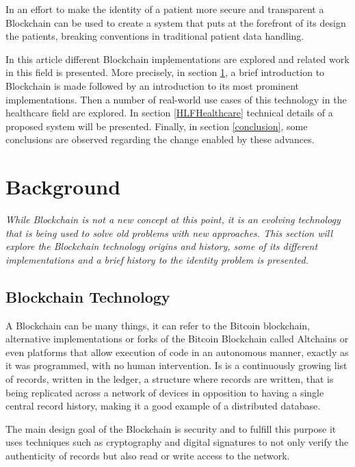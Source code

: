 \documentclass[]{llncs}
\begin{document}
In an effort to make the identity of a patient more secure and transparent a Blockchain can be used to create a 
system that puts at the forefront of its design the patients, breaking conventions in traditional patient data handling.

In this article different Blockchain implementations are explored and related work in this field is presented. 
More precisely, in section \ref{background}, a brief introduction to Blockchain is made followed by an introduction 
to its most prominent implementations. Then a number of real-world use cases of this technology in the healthcare field 
are explored. In section \ref{HLFHealthcare} technical details of a proposed system will be presented. 
Finally, in section \ref{conclusion},  some conclusions are observed regarding the change enabled by these advances.



\section{Background} \label{background}

\textit{While Blockchain is not a new concept at this point, it is an evolving technology that is 
being used to solve old problems with new approaches. This section will explore the Blockchain technology 
origins and history, some of its different implementations and a brief history to the identity problem is presented.}

\subsection{Blockchain Technology}

A Blockchain can be many things, it can refer to the Bitcoin blockchain, alternative implementations 
or forks of the Bitcoin Blockchain called Altchains or even platforms that allow execution of code 
in an autonomous manner, exactly as it was programmed, with no human intervention. 
Is is a continuously growing list of records, written in the ledger, a structure where records are
written, that is being replicated across a network of devices in opposition to having a 
single central record history, making it a good example of a distributed database.
\cite{Wood2017}
  
The main design goal of the Blockchain is security and to fulfill this purpose it uses techniques 
such as cryptography and digital signatures to not only verify the authenticity of records but also 
read or write access to the network.
\end{document}
